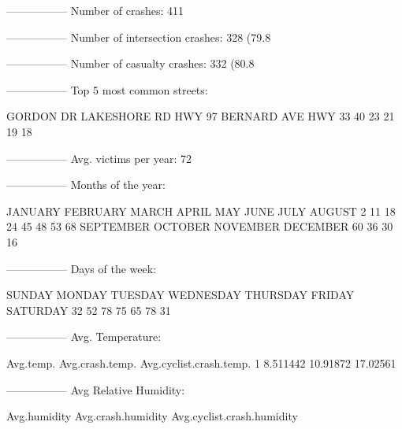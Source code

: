 \documentclass[11pt, a4paper]{article}
\begin{document}
\begin{Schunk}
\begin{Soutput}
-----------------
Number of crashes: 411
\end{Soutput}
\begin{Soutput}
-----------------
Number of intersection crashes: 328 (79.8%
\end{Soutput}
\begin{Soutput}
-----------------
Number of casualty crashes: 332 (80.8%
\end{Soutput}
\begin{Soutput}
-----------------
Top 5 most common streets:
\end{Soutput}
\begin{Soutput}
   GORDON DR LAKESHORE RD       HWY 97  BERNARD AVE       HWY 33 
          40           23           21           19           18 
\end{Soutput}
\begin{Soutput}
-----------------
Avg. victims per year: 72
\end{Soutput}
\begin{Soutput}
-----------------
Months of the year:
\end{Soutput}
\begin{Soutput}
  JANUARY  FEBRUARY     MARCH     APRIL       MAY      JUNE      JULY    AUGUST 
        2        11        18        24        45        48        53        68 
SEPTEMBER   OCTOBER  NOVEMBER  DECEMBER 
       60        36        30        16 
\end{Soutput}
\begin{Soutput}
-----------------
Days of the week:
\end{Soutput}
\begin{Soutput}
   SUNDAY    MONDAY   TUESDAY WEDNESDAY  THURSDAY    FRIDAY  SATURDAY 
       32        52        78        75        65        78        31 
\end{Soutput}
\begin{Soutput}
-----------------
Avg. Temperature:
\end{Soutput}
\begin{Soutput}
  Avg.temp. Avg.crash.temp. Avg.cyclist.crash.temp.
1  8.511442        10.91872                17.02561
\end{Soutput}
\begin{Soutput}
-----------------
Avg Relative Humidity:
\end{Soutput}
\begin{Soutput}
  Avg.humidity Avg.crash.humidity Avg.cyclist.crash.humidity

\end{Soutput}
\end{Schunk}
\end{document}
